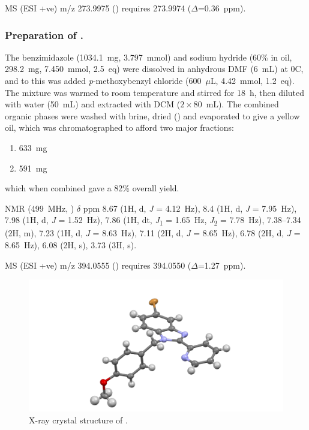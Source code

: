 \begin{refsection}
MS (ESI +ve) m/z 273.9975 ()  requires 273.9974 ($\Delta$=0.36~ppm).

\subsubsection{Preparation of .}
The benzimidazole  (1034.1~mg, 3.797~mmol) and sodium hydride (60\% in oil, 298.2~mg, 7.450~mmol, 2.5~eq) were dissolved in anhydrous DMF (6~mL) at 0\degree{}C, and to this was added \textit{p}-methoxybenzyl chloride (600~$\mu$L, 4.42~mmol, 1.2~eq).
The mixture was warmed to room temperature and stirred for 18~h, then diluted with water (50~mL) and extracted with DCM ($2\times80$~mL).
The combined organic phases were washed with brine, dried () and evaporated to give a yellow oil, which was chromatographed to afford two major fractions:
\begin{enumerate}
    \item 633~mg
    \item 591~mg
\end{enumerate}
which when combined gave a 82\% overall yield.

 NMR (499~MHz, ) $\delta$ ppm 8.67 (1H, d, \emph{J} = 4.12~Hz), 8.4 (1H, d, \emph{J} = 7.95~Hz), 7.98 (1H, d, \emph{J} = 1.52~Hz), 7.86 (1H, dt, \emph{J}\textsubscript{1} = 1.65~Hz, \emph{J}\textsubscript{2} = 7.78~Hz), 7.38--7.34 (2H, m), 7.23 (1H, d, \emph{J} = 8.63~Hz), 7.11 (2H, d, \emph{J} = 8.65~Hz), 6.78 (2H, d, \emph{J} = 8.65~Hz), 6.08 (2H, s), 3.73 (3H, s).

MS (ESI +ve) m/z 394.0555 ()  requires 394.0550 ($\Delta$=1.27~ppm).

\begin{figure}
    \includegraphics[width=0.8\linewidth]{Figures/rhs-bromo-2py-pmb-xtal.pdf}
    \caption{X-ray crystal structure of .}
\end{figure}


\end{refsection}
